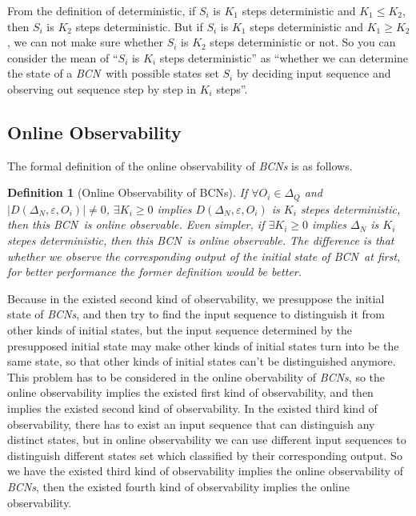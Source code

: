 \documentclass[conference]{IEEEtran} %
\newtheorem{definition}{Definition}
\def \BCN {{\em BCN}}
\begin{document}
From the definition of deterministic, if $S_i$ is $K_1$ steps deterministic and $K_1\leq K_2$, then $S_i$ is $K_2$ steps deterministic. But if $S_i$ is $K_1$ steps deterministic and $K_1\geq K_2$, we can not make sure whether $S_i$ is $K_2$ steps deterministic or not. So you can consider the mean of ``$S_i$ is $K_i$ steps deterministic'' as ``whether we can determine the state of a \BCN\ with possible states set $S_i$ by deciding input sequence and observing out sequence step by step in $K_i$ steps''.
\subsection{Online Observability}
The formal definition of the online observability of {\em BCNs} is as follows.
\begin{definition}[Online Observability of  BCNs]
If $\forall  O_i\in \Delta_Q$ and $|D\left(\Delta_N,\varepsilon, O_i\right)|\neq 0$, $\exists K_i \ge 0$ implies $D\left(\Delta_N,\varepsilon,O_i\right)$ is $K_i$ stepes deterministic, then this \BCN\ is online observable. Even simpler, if $\exists K_i \ge 0$ implies $\Delta_N$ is $K_i$ stepes deterministic, then this \BCN\ is online observable. The difference is that whether we observe the corresponding output of the initial state of \BCN\ at first, for better performance the former definition would be better.
\end{definition}

Because in the existed second kind of observability, we presuppose the initial state of {\em BCNs}, and then try to find the input sequence to distinguish it from other kinds of initial states, but the input sequence determined by the presupposed initial state may make other kinds of initial states turn into be the same state, so that other kinds of initial states can't be distinguished anymore. This problem has to be considered in the online obervability of {\em BCNs}, so the online observability implies the existed first kind of observability, and then implies the existed second kind of observability. In the existed third kind of observability, there has to exist an input sequence that can distinguish any distinct states, but in online observability we can use different input sequences to distinguish different states set which classified by their corresponding output. So we have the existed third kind of observability implies the online observability of {\em BCNs}, then the existed fourth kind of observability implies the online observability.
\end{document}
